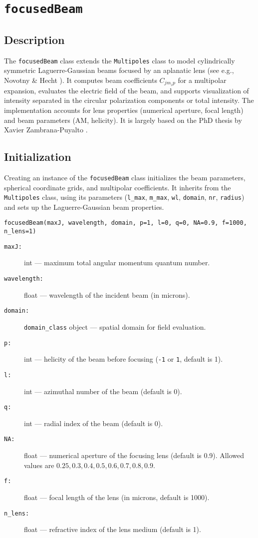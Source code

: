 \section{\texttt{focusedBeam}}

\subsection{Description}
The \texttt{focusedBeam} class extends the \texttt{Multipoles} class to model cylindrically symmetric Laguerre-Gaussian beams focused by an aplanatic lens (see e.g., Novotny \& Hecht \cite{nanooptics}). It computes beam coefficients \( C_{j m_z p} \) for a multipolar expansion, evaluates the electric field of the beam, and supports visualization of intensity separated in the circular polarization components or total intensity. The implementation accounts for lens properties (numerical aperture, focal length) and beam parameters (AM, helicity). It is largely based on the PhD thesis by Xavier Zambrana-Puyalto \cite{xavi}.

\subsection{Initialization}
Creating an instance of the \texttt{focusedBeam} class initializes the beam parameters, spherical coordinate grids, and multipolar coefficients. It inherits from the \texttt{Multipoles} class, using its parameters (\texttt{l\_max}, \texttt{m\_max}, \texttt{wl}, \texttt{domain}, \texttt{nr}, \texttt{radius}) and sets up the Laguerre-Gaussian beam properties.

\begin{verbatim}
focusedBeam(maxJ, wavelength, domain, p=1, l=0, q=0, NA=0.9, f=1000, n_lens=1)
\end{verbatim}

\begin{description}
    \item[\texttt{maxJ:}] int — maximum total angular momentum quantum number.
    \item[\texttt{wavelength:}] float — wavelength of the incident beam (in microns).
    \item[\texttt{domain:}] \texttt{domain\_class} object — spatial domain for field evaluation.
    \item[\texttt{p:}] int — helicity of the beam before focusing (\texttt{-1} or \texttt{1}, default is 1).
    \item[\texttt{l:}] int — azimuthal number of the beam (default is 0).
    \item[\texttt{q:}] int — radial index of the beam (default is 0).
    \item[\texttt{NA:}] float — numerical aperture of the focusing lens (default is 0.9). Allowed values are \( 0.25, 0.3, 0.4, 0.5, 0.6, 0.7, 0.8, 0.9 \).
    \item[\texttt{f:}] float — focal length of the lens (in microns, default is 1000).
    \item[\texttt{n\_lens:}] float — refractive index of the lens medium (default is 1).
\end{description}

